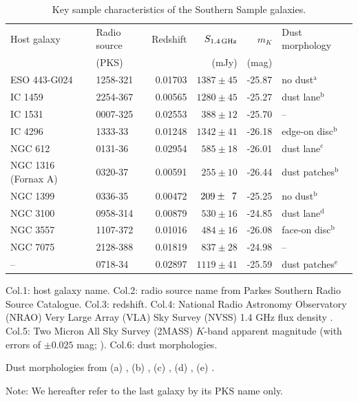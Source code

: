 	\begin{table}
		\centering
	\begin{threeparttable}
		\caption{Key sample characteristics of the Southern Sample galaxies.}
		\label{tab:sample}
		\begin{tabular}{l l r r r l}
			\hline
			\hline
			Host galaxy	& Radio source 	& Redshift	& $S_\text{1.4\,GHz}$	& $m_K$ & Dust morphology\\
						& (PKS) 		& 			& (mJy) 			& (mag)	&\\
			\hline 
			ESO 443-G024 & 1258-321 	& 0.01703	& $1387 \pm 45$		& -25.87 & no dust$^\text{a}$	\\ 
			IC 1459 	& 2254-367 		& 0.00565 	& $1280 \pm 45$		& -25.27 & dust lane$^\text{b}$	\\
			IC 1531 	& 0007-325 		& 0.02553 	& $388 \pm 12$		& -25.70 & --					\\
			IC 4296		& 1333-\leavevmode\phantom{0}33 		& 0.01248 	& $1342 \pm 41$		& -26.18 & edge-on disc$^\text{b}$ \\
			NGC 612 	& 0131-\leavevmode\phantom{0}36 		& 0.02954 	& $585 \pm 18$		& -26.01 & dust lane$^\text{c}$	\\
			NGC 1316 (Fornax A) & 0320-\leavevmode\phantom{0}37 & 0.00591 	& $255 \pm 10$		& -26.44 & dust patches$^\text{b}$ \\
			NGC 1399 	& 0336-\leavevmode\phantom{0}35 & 0.00472 	& $209 \pm \leavevmode\phantom{0}7$	& -25.25 & no dust$^\text{b}$	\\
			NGC 3100 	& 0958-314 		& 0.00879 	& $530 \pm 16$		& -24.85 & dust lane$^\text{d}$	\\
			NGC 3557 	& 1107-372 		& 0.01016 	& $484 \pm 16$		& -26.08 & face-on disc$^\text{b}$\\
			NGC 7075 	& 2128-388 		& 0.01819 	& $837 \pm 28$		& -24.98 & --					\\
			--			& 0718-\leavevmode\phantom{0}34 		& 0.02897 	& $1119 \pm 41$		& -25.59 & dust patches$^\text{e}$\\
			\hline
			\hline
		\end{tabular}
		\begin{tablenotes}
		\item Col.1: host galaxy name. Col.2: radio source name from Parkes Southern Radio Source Catalogue. Col.3: redshift. Col.4: National Radio Astronomy Observatory (NRAO) Very Large Array (VLA) Sky Survey (NVSS) 1.4 GHz flux density \citep{Condon1998}. Col.5: Two Micron All Sky Survey (2MASS) $K$-band apparent magnitude (with errors of $\pm 0.025$ mag; \citealt{Skrutskie2006}). Col.6: dust morphologies. 
		\item Dust morphologies from (a) \citet{Govoni2000}, (b) \citet{Lauer2005}, (c) \citet{Bettoni2001}, (d) \citet{Sandage1979}, (e) \citet{Colbert2001}. 
		\item Note: We hereafter refer to the last galaxy by its PKS name only.
		\end{tablenotes}
	\end{threeparttable}
	\end{table}

